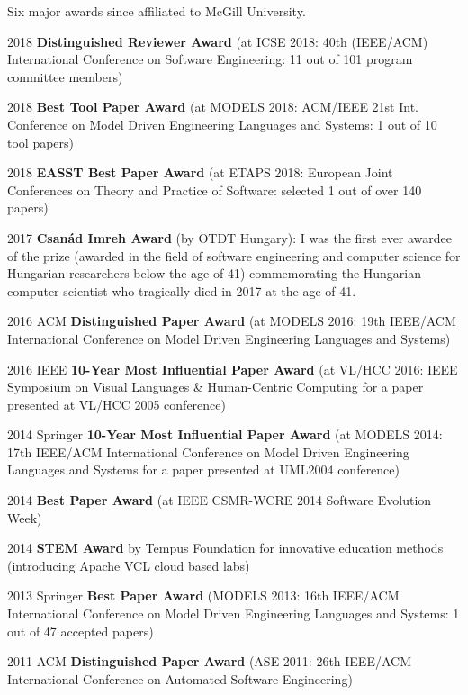 Six major awards since affiliated to McGill University. 
\begin{yearlist}
\item[2018] \textbf{Distinguished Reviewer Award} (at ICSE 2018: 40th (IEEE/ACM) International Conference on Software Engineering: 11 out of 101 program committee members)
\item[2018] \textbf{Best Tool Paper Award} (at MODELS 2018: ACM/IEEE 21st Int. Conference on Model Driven Engineering Languages and Systems: 1 out of 10 tool papers)
\item[2018] \textbf{EASST Best Paper Award} (at ETAPS 2018: European Joint Conferences on Theory and Practice of Software: selected 1 out of over 140 papers)
\item[2017] \textbf{Csanád Imreh Award} (by OTDT Hungary): \newline I was the first ever awardee of the prize (awarded in the field of software engineering and computer science for Hungarian researchers below the age of 41) commemorating the Hungarian computer scientist who tragically died in 2017 at the age of 41.  
\item[2016] ACM \textbf{Distinguished Paper Award} (at MODELS 2016: 19th IEEE/ACM International Conference on Model Driven Engineering Languages and Systems) 
\item[2016] IEEE \textbf{10-Year Most Influential Paper Award} \newline (at VL/HCC 2016: IEEE Symposium on Visual Languages \& Human-Centric Computing for a paper presented at VL/HCC 2005 conference) 
\item[2014] Springer \textbf{10-Year Most Influential Paper Award} \newline (at MODELS 2014: 17th IEEE/ACM International Conference on Model Driven Engineering Languages and Systems for a paper presented at UML2004 conference) 
\item[2014] \textbf{Best Paper Award} (at IEEE CSMR-WCRE 2014 Software Evolution Week) 
\item[2014] \textbf{STEM Award} by Tempus Foundation for innovative education methods (introducing Apache VCL cloud based labs)
\item[2013] Springer \textbf{Best Paper Award} (MODELS 2013: 16th IEEE/ACM International Conference on Model Driven Engineering Languages and Systems: 1 out of 47 accepted papers) 
\item[2011] ACM \textbf{Distinguished Paper Award} (ASE 2011: 26th IEEE/ACM International Conference on Automated Software Engineering) 

\end{yearlist}
